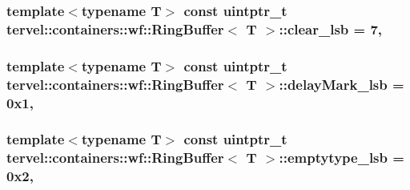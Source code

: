 \subsubsection[{clear\+\_\+lsb}]{\setlength{\rightskip}{0pt plus 5cm}template$<$typename T$>$ const uintptr\+\_\+t {\bf tervel\+::containers\+::wf\+::\+Ring\+Buffer}$<$ T $>$\+::clear\+\_\+lsb = 7\hspace{0.3cm}{\ttfamily [static]}, {\ttfamily [private]}}\label{classtervel_1_1containers_1_1wf_1_1_ring_buffer_afabc2215759bfbb00144024609700b7d}
\hypertarget{classtervel_1_1containers_1_1wf_1_1_ring_buffer_a1bd646f1d7df0a14d64078d2dcef1cb5}{}
\subsubsection[{delay\+Mark\+\_\+lsb}]{\setlength{\rightskip}{0pt plus 5cm}template$<$typename T$>$ const uintptr\+\_\+t {\bf tervel\+::containers\+::wf\+::\+Ring\+Buffer}$<$ T $>$\+::delay\+Mark\+\_\+lsb = 0x1\hspace{0.3cm}{\ttfamily [static]}, {\ttfamily [private]}}\label{classtervel_1_1containers_1_1wf_1_1_ring_buffer_a1bd646f1d7df0a14d64078d2dcef1cb5}
\hypertarget{classtervel_1_1containers_1_1wf_1_1_ring_buffer_aaeeec7e2573a54c06823fb6800437b4f}{}
\subsubsection[{emptytype\+\_\+lsb}]{\setlength{\rightskip}{0pt plus 5cm}template$<$typename T$>$ const uintptr\+\_\+t {\bf tervel\+::containers\+::wf\+::\+Ring\+Buffer}$<$ T $>$\+::emptytype\+\_\+lsb = 0x2\hspace{0.3cm}{\ttfamily [static]}, {\ttfamily [private]}}\label{classtervel_1_1containers_1_1wf_1_1_ring_buffer_aaeeec7e2573a54c06823fb6800437b4f}
\hypertarget{classtervel_1_1containers_1_1wf_1_1_ring_buffer_a94a7b260355e3e1c3c97b649304b3302}{}
